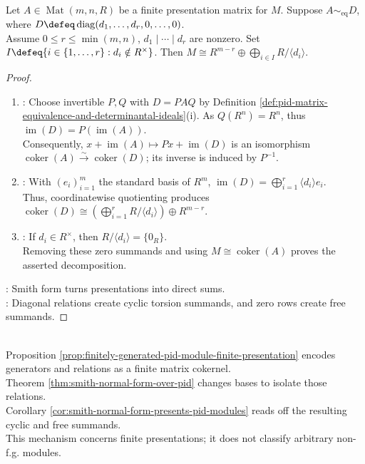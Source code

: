 \begin{corollary} \label{cor:smith-normal-form-presents-pid-modules} \\
Let $A\in\operatorname{Mat}(m,n,R)$ be a finite presentation matrix for $M$. Suppose $A\sim_{\mathrm{eq}}D$, where $D\defeq\operatorname{diag}(d_1,\ldots,d_r,0,\ldots,0)$.\\
Assume $0\leq r\leq\min(m,n)$, $d_1\mid\cdots\mid d_r$ are nonzero. Set $I\defeq\{i\in\{1,\ldots,r\}:d_i\notin R^\times\}$. Then $M\cong R^{m-r}\oplus\bigoplus_{i\in I}R/\langle d_i\rangle$.
\begin{proof}
\begin{enumerate}[label=(\roman*)]
\setlength{\itemsep}{0pt}
\item {}: Choose invertible $P,Q$ with $D=PAQ$ by Definition \ref{def:pid-matrix-equivalence-and-determinantal-ideals}(i). As $Q(R^n)=R^n$, thus $\operatorname{im}(D)=P(\operatorname{im}(A))$.\\
Consequently, $x+\operatorname{im}(A)\mapsto Px+\operatorname{im}(D)$ is an isomorphism $\operatorname{coker}(A)\xrightarrow{\sim}\operatorname{coker}(D)$; its inverse is induced by $P^{-1}$.
\item {}: With $(e_i)_{i=1}^m$ the standard basis of $R^m$, $\operatorname{im}(D)=\bigoplus_{i=1}^r\langle d_i\rangle e_i$.\\
Thus, coordinatewise quotienting produces $\operatorname{coker}(D)\cong\left(\bigoplus_{i=1}^rR/\langle d_i\rangle\right)\oplus R^{m-r}$.
\item {}: If $d_i\in R^\times$, then $R/\langle d_i\rangle=\{0_R\}$.\\
Removing these zero summands and using $M\cong\operatorname{coker}(A)$ proves the asserted decomposition.
\end{enumerate}
: Smith form turns presentations into direct sums.\\
: Diagonal relations create cyclic torsion summands, and zero rows create free summands.
\end{proof}
\end{corollary}

\begin{perspective} \label{per:smith-normal-form-and-module-presentations} \\
Proposition \ref{prop:finitely-generated-pid-module-finite-presentation} encodes generators and relations as a finite matrix cokernel.\\
Theorem \ref{thm:smith-normal-form-over-pid} changes bases to isolate those relations.\\
Corollary \ref{cor:smith-normal-form-presents-pid-modules} reads off the resulting cyclic and free summands.\\
This mechanism concerns finite presentations; it does not classify arbitrary non-f.g. modules.
\end{perspective}

